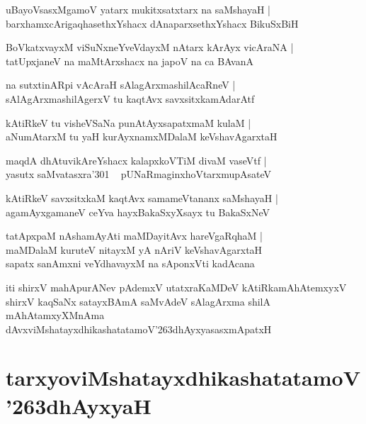\documentclass[twoside,12pt,openright]{book}
\def\S{\char'263}
\newcounter{shloka}[chapter]
\begin{document}
\begin{shloka}%
uBayoVsasxMgamoV yatarx mukitxsatxtarx na saMshayaH |\\
barxhamxcArigaqhasethxYshacx dAnaparxsethxYshacx BikuSxBiH 
\end{shloka}

\begin{shloka}%
BoVkatxvayxM viSuNxneYveVdayxM nAtarx kArAyx vicAraNA |\\
tatUpxjaneV na maMtArxshacx na japoV na ca BAvanA 
\end{shloka}

\begin{shloka}%
na sutxtinARpi vAcAraH sAlagArxmashilAcaRneV |\\
sAlAgArxmashilAgerxV tu kaqtAvx savxsitxkamAdarAtf
\end{shloka}

\begin{shloka}%
kAtiRkeV tu visheVSaNa punAtAyxsapatxmaM kulaM |\\
aNumAtarxM tu yaH kurAyxnamxMDalaM keVshavAgarxtaH 
\end{shloka}

\begin{shloka}%
maqdA dhAtuvikAreYshacx kalapxkoVTiM divaM vaseVtf |\\
yasutx saMvatasxra\char'301 ~ pUNaRmaginxhoVtarxmupAsateV 
\end{shloka}

\begin{shloka}%
kAtiRkeV savxsitxkaM kaqtAvx samameVtananx saMshayaH |\\
agamAyxgamaneV ceYva hayxBakaSxyXsayx tu BakaSxNeV  
\end{shloka}

\begin{shloka}%
tatApxpaM nAshamAyAti maMDayitAvx hareVgaRqhaM |\\
maMDalaM kuruteV nitayxM yA nAriV keVshavAgarxtaH \\
sapatx sanAmxni veYdhavayxM na sAponxVti kadAcana
\end{shloka}

\begin{center}
iti shirxV mahApurANev pAdemxV utatxraKaMDeV kAtiRkamAhAtemxyxV shirxV kaqSaNx satayxBAmA saMvAdeV 
sAlagArxma shilA mAhAtamxyXMnAma dAvxviMshatayxdhikashatatamoV\S dhAyxyasasxmApatxH 
\end{center}

\chapter{tarxyoviMshatayxdhikashatatamoV\S dhAyxyaH}
\end{document}
